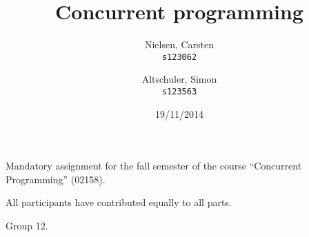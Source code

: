 \documentclass{article}
\title{Concurrent programming}
\author{
  Nielsen, Carsten\\
  \texttt{s123062}
  \and
  Altschuler, Simon\\
  \texttt{s123563}
}
\date{19/11/2014}
\begin{document}
\maketitle

\begin{center}
  Mandatory assignment for the fall semester of the course ``Concurrent Programming'' (02158).

  All participants have contributed equally to all parts.

  Group 12.
\end{center}
\newpage

\tableofcontents
\newpage









\newpage

\end{document}
